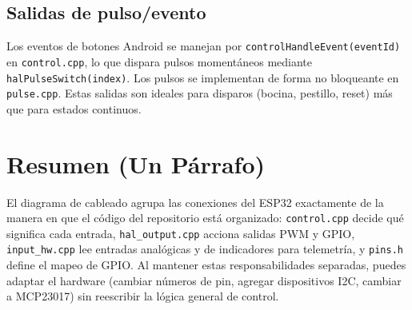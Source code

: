 \subsection{Salidas de pulso/evento}
Los eventos de botones Android se manejan por \texttt{controlHandleEvent(eventId)} en \texttt{control.cpp}, lo que dispara
pulsos momentáneos mediante \texttt{halPulseSwitch(index)}. Los pulsos se implementan de forma no bloqueante en \texttt{pulse.cpp}.
Estas salidas son ideales para disparos (bocina, pestillo, reset) más que para estados continuos.

\section{Resumen (Un Párrafo)}
\label{sec:wiring-resume}

El diagrama de cableado agrupa las conexiones del ESP32 exactamente de la manera en que el código del repositorio está organizado:
\texttt{control.cpp} decide qué significa cada entrada, \texttt{hal\_output.cpp} acciona salidas PWM y GPIO,
\texttt{input\_hw.cpp} lee entradas analógicas y de indicadores para telemetría, y \texttt{pins.h} define el mapeo de GPIO.
Al mantener estas responsabilidades separadas, puedes adaptar el hardware (cambiar números de pin, agregar dispositivos I2C, cambiar a MCP23017)
sin reescribir la lógica general de control.